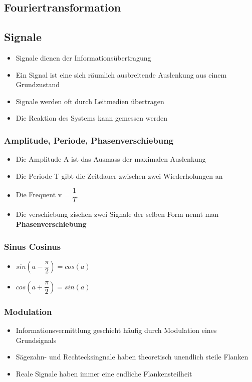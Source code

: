 \documentclass[8pt,a4paper]{scrartcl}
\begin{document}
\begin{multicols*}{3}
					\section{Fouriertransformation}
						\subsection{Signale}
							\begin{itemize}\itemsep0pt
								\item Signale dienen der Informationsübertragung
								\item Ein Signal ist eine sich räumlich ausbreitende Auslenkung aus einem Grundzustand
								\item Signale werden oft durch Leitmedien übertragen
								\item Die Reaktion des Systems kann gemessen werden
							\end{itemize}
							
							\subsubsection{Amplitude, Periode, Phasenverschiebung}
								\begin{itemize}\itemsep0pt
									\item Die Amplitude A ist das Ausmass der maximalen Auslenkung
									\item Die Periode T gibt die Zeitdauer zwischen zwei Wiederholungen an
									\item Die Frequent v = $\dfrac{1}{T}$
									\item Die verschiebung zischen zwei Signale der selben Form nennt man \textbf{Phasenverschiebung}
								\end{itemize}	
							
							\subsubsection{Sinus Cosinus}
								\begin{itemize}\itemsep0pt
									\item $sin(a-\dfrac{\pi}{2}) = cos(a)$
									\item $cos(a+\dfrac{\pi}{2}) = sin(a)$
								\end{itemize}
							
							\subsubsection{Modulation}
								\begin{itemize}\itemsep0pt
									\item Informationsvermittlung geschieht häufig durch Modulation eines Grundsignals
									\item Sägezahn- und Rechtecksingnale haben theoretisch unendlich steile Flanken
									\item Reale Signale haben immer eine endliche Flankensteilheit
								\end{itemize}	
								

\end{multicols*}
\end{document}
